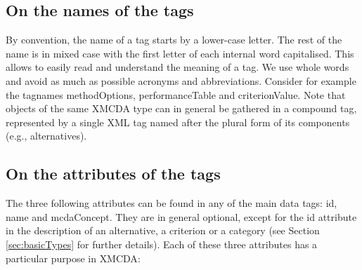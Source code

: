 \documentclass[a4paper,oneside,10 pt]{article}
\newcommand{\XMCDA}{{\asciifamily XMCDA}\xspace}
\newcommand{\code}{\asciifamily}
\begin{document}
\subsection{On the names of the tags}

By convention, the name of a tag starts by a lower-case letter. The rest of the name is in mixed case with the first letter of each internal word capitalised. This allows to easily read and understand the meaning of a tag. We use whole words and avoid as much as possible acronyms and abbreviations. Consider for example the tagnames {\code methodOptions}, {\code performanceTable} and    {\code criterionValue}. 
 Note that objects of the same \XMCDA type can in general be gathered in a compound tag, represented by a single {\code XML} tag named after the plural form of its components (e.g., {\code alternatives}). 

\subsection{On the attributes of the tags}

The three following attributes can be found in any of the main data tags: {\code id},  {\code name} and {\code mcdaConcept}. They are in general optional, except for the {\code id} attribute in the description of an alternative, a criterion or a category (see Section \ref{sec:basicTypes} for further details). Each of these three attributes has a particular purpose in  \XMCDA:
\end{document}

